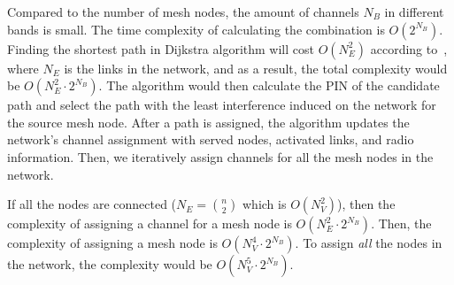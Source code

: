 Compared to the number of mesh nodes, the amount of channels $N_B$ in
different bands is small. The time complexity of calculating the combination
is $O(2^{N_B})$. Finding the shortest path in Dijkstra algorithm will
cost $O(N_E^2)$ according to~\cite{golden1976shortest}, where $N_E$ is the links in the
network, and as a result, the total complexity would be $O(N_E^2\cdot 2^{N_B})$.
The algorithm would then calculate the PIN of the candidate path and select the path
with the least interference induced on the network for the source mesh node.
After a path is assigned, the algorithm updates the network's channel assignment
with served nodes, activated links, and radio information. Then,
we iteratively assign channels for all the mesh nodes in the
network.

If all the nodes are connected ($N_E={n \choose 2}$ which is $O(N_V^2)$), 
then the complexity of assigning a channel for a mesh node is $O(N_E^2\cdot2^{N_B})$. 
Then, the complexity of assigning a mesh node is $O(N_V^4\cdot2^{N_B})$.
To assign {\it all} the nodes in the network, the complexity would 
be $O(N_V^5\cdot2^{N_B})$.


